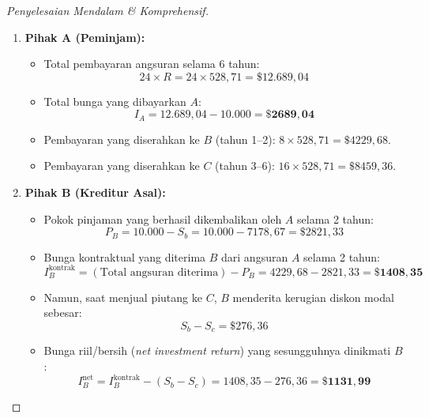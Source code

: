 \documentclass[11pt,a4paper]{article}
\begin{document}
\begin{proof}[Penyelesaian Mendalam \& Komprehensif]
\begin{enumerate}[label=\textbf{\arabic*.}]
    \item \textbf{Pihak A (Peminjam):}
    \begin{itemize}
        \item Total pembayaran angsuran selama 6 tahun:
        \begin{equation*}
            24 \times R = 24 \times 528{,}71 = \$12.689{,}04
        \end{equation*}
        \item Total bunga yang dibayarkan $A$:
        \begin{equation*}
            I_A = 12.689{,}04 - 10.000 = \mathbf{\$2689{,}04}
        \end{equation*}
        \item Pembayaran yang diserahkan ke $B$ (tahun 1--2): $8 \times 528{,}71 = \$4229{,}68$.
        \item Pembayaran yang diserahkan ke $C$ (tahun 3--6): $16 \times 528{,}71 = \$8459{,}36$.
    \end{itemize}

    \item \textbf{Pihak B (Kreditur Asal):}
    \begin{itemize}
        \item Pokok pinjaman yang berhasil dikembalikan oleh $A$ selama 2 tahun:
        \begin{equation*}
            P_B = 10.000 - S_b = 10.000 - 7178{,}67 = \$2821{,}33
        \end{equation*}
        \item Bunga kontraktual yang diterima $B$ dari angsuran $A$ selama 2 tahun:
        \begin{equation*}
            I_B^{\text{kontrak}} = (\text{Total angsuran diterima}) - P_B = 4229{,}68 - 2821{,}33 = \mathbf{\$1408{,}35}
        \end{equation*}
        \item Namun, saat menjual piutang ke $C$, $B$ menderita kerugian diskon modal sebesar:
        \begin{equation*}
            S_b - S_c = \$276{,}36
        \end{equation*}
        \item Bunga riil/bersih (\textit{net investment return}) yang sesungguhnya dinikmati $B$:
        \begin{equation*}
            I_B^{\text{net}} = I_B^{\text{kontrak}} - (S_b - S_c) = 1408{,}35 - 276{,}36 = \mathbf{\$1131{,}99}
        \end{equation*}
    \end{itemize}


\end{enumerate}
\end{proof}
\end{document}
